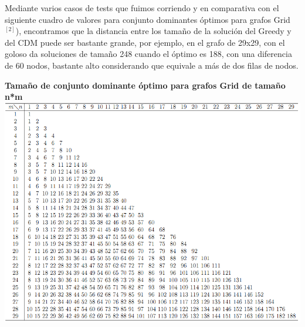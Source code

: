 Mediante varios casos de tests que fuimos corriendo y en comparativa con el  siguiente cuadro de valores para conjunto dominantes óptimos para grafos Grid$^{[2]}$), encontramos que la distancia entre los tamaño de la solución
del Greedy y del CDM puede ser bastante grande, por ejemplo, en el grafo de 29x29, con el goloso da soluciones de tamaño 248 cuando el óptimo es 188, con una diferencia de 60 nodos, bastante alto considerando que equivale a más de dos filas de nodos.\\

\begin {center}
\textbf{Tamaño de conjunto dominante óptimo para grafos Grid de tamaño n*m}
\includegraphics[width=18cm]{./graficos/cd_grid_exacto.png}
\end {center} 


